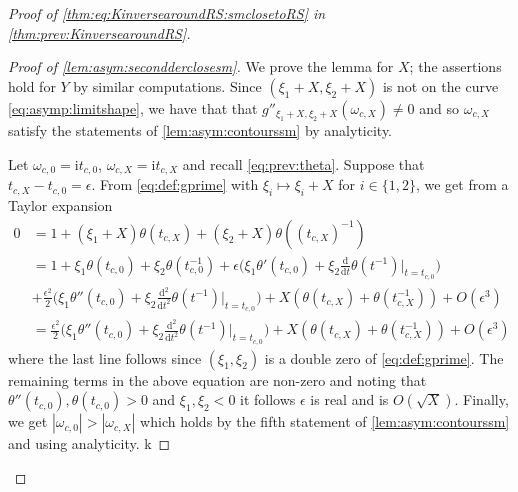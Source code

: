 \documentclass[11pt,twoside]{amsart}
\theoremstyle{plain}
\numberwithin{quest}{section}
\theoremstyle{remark}
\numberwithin{rem}{section}
\theoremstyle{definition}
\begin{document}
\begin{proof}[Proof of \eqref{thm:eq:KinversearoundRS:smclosetoRS} in \cref{thm:prev:KinversearoundRS}]
	
		
		\begin{proof}[Proof of \cref{lem:asym:secondderclosesm}]
			We prove the lemma for $X$; the assertions hold for $Y$ by similar computations. 
			Since $(\xi_1+X,\xi_2+X)$ is not on the curve \eqref{eq:asymp:limitshape}, we have that that $g''_{\xi_1+X,\xi_2+X}(\omega_{c,X})\not = 0$ and so $\omega_{c,X}$ satisfy the statements of \cref{lem:asym:contourssm} by analyticity.  
			
			Let $\omega_{c,0}=\mathrm{i} t_{c,0}$, $\omega_{c,X}=\mathrm{i} t_{c,X}$ and recall \eqref{eq:prev:theta}.
			Suppose that $t_{c,X}-t_{c,0}=\epsilon$. From \eqref{eq:def:gprime} with $\xi_i \mapsto \xi_i+X$ for $i \in \{1,2\}$, we get from a Taylor expansion
			\begin{equation}
				\begin{split} \label{lemproof:eq:secondderclosesm}
					0&=1 + (\xi_1+X) \theta( t_{c,X}) + (\xi_2+X)\theta((t_{c,X})^{-1}) \\
					&=1+\xi_1\theta(t_{c,0})+ \xi_2 \theta(t_{c,0}^{-1}) +\epsilon\big(\xi_1\theta'(t_{c,0})+ \xi_2 \frac{\mathrm{d}}{\mathrm{d}t} \theta(t^{-1})\big|_{t=t_{c,0}}\big)\\&  +\frac{\epsilon^2}{2}\big(\xi_1\theta''(t_{c,0})+ \xi_2 \frac{\mathrm{d}^2}{\mathrm{d}t^2} \theta(t^{-1})\big|_{t=t_{c,0}}\big) +X(\theta( t_{c,X})+\theta(t_{c,X}^{-1}))+O(\epsilon^3)\\
					&=\frac{\epsilon^2}{2}\big(\xi_1\theta''(t_{c,0})+ \xi_2 \frac{\mathrm{d}^2}{\mathrm{d}t^2} \theta(t^{-1})\big|_{t=t_{c,0}}\big) +X(\theta( t_{c,X})+\theta(t_{c,X}^{-1}))+O(\epsilon^3)
				\end{split}
			\end{equation}  
			where the last line follows since $(\xi_1,\xi_2)$ is a double zero of \eqref{eq:def:gprime}. The remaining terms in the above equation are non-zero and noting that $\theta''(t_{c,0}),\theta(t_{c,0})>0$ and $\xi_1,\xi_2<0$ it follows $\epsilon$ is real and is $O(\sqrt{X})$.  Finally, we get $|\omega_{c,0}|>|\omega_{c,X}|$ which holds by the fifth statement of \cref{lem:asym:contourssm} and using analyticity. 
	k	
		\end{proof}
	\end{proof}
    
\end{document}
